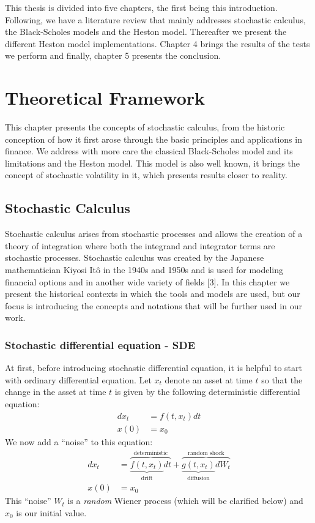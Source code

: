 \documentclass[12pt,oneside]{reedthesis}
\theoremstyle{definition}
\theoremstyle{definition}
\theoremstyle{remark}
\begin{document}
  This thesis is divided into five chapters, the first being this
  introduction. Following, we have a literature review that mainly
  addresses stochastic calculus, the Black-Scholes models and the Heston
  model. Thereafter we present the different Heston model implementations.
  Chapter 4 brings the results of the tests we perform and finally,
  chapter 5 presents the conclusion.
  
  \chapter{Theoretical Framework}\label{lt-review}
  
  This chapter presents the concepts of stochastic calculus, from the
  historic conception of how it first arose through the basic principles
  and applications in finance. We address with more care the classical
  Black-Scholes model and its limitations and the Heston model. This model
  is also well known, it brings the concept of stochastic volatility in
  it, which presents results closer to reality.
  
  \section{Stochastic Calculus}\label{stochastic-calculus}
  
  Stochastic calculus arises from stochastic processes and allows the
  creation of a theory of integration where both the integrand and
  integrator terms are stochastic processes. Stochastic calculus was
  created by the Japanese mathematician Kiyosi Itô in the 1940s and 1950s
  and is used for modeling financial options and in another wide variety
  of fields {[}3{]}. In this chapter we present the historical contexts in
  which the tools and models are used, but our focus is introducing the
  concepts and notations that will be further used in our work.
  
  \subsection{Stochastic differential equation -
  SDE}\label{stochastic-differential-equation---sde}
  
  At first, before introducing stochastic differential equation, it is
  helpful to start with ordinary differential equation. Let \(x_t\) denote
  an asset at time \(t\) so that the change in the asset at time \(t\) is
  given by the following deterministic differential equation:
  \begin{align}
  dx_t &= f(t, x_t)dt \\
  x(0) &= x_0 \nonumber
  \end{align}
  We now add a ``noise'' to this equation:
  \begin{align} \label{eq:sde1}
  dx_t &= \overbrace{\underbrace{f(t, x_t)}_\text{drift}dt}^\text{deterministic} + \overbrace{\underbrace{g(t, x_t)}_\text{diffusion}dW_t}^\text{random shock} \\
  x(0) &= x_0 \nonumber
  \end{align}
  This ``noise'' \(W_t\) is a \emph{random} Wiener process (which will be
  clarified below) and \(x_0\) is our initial value.
  
\end{document}
